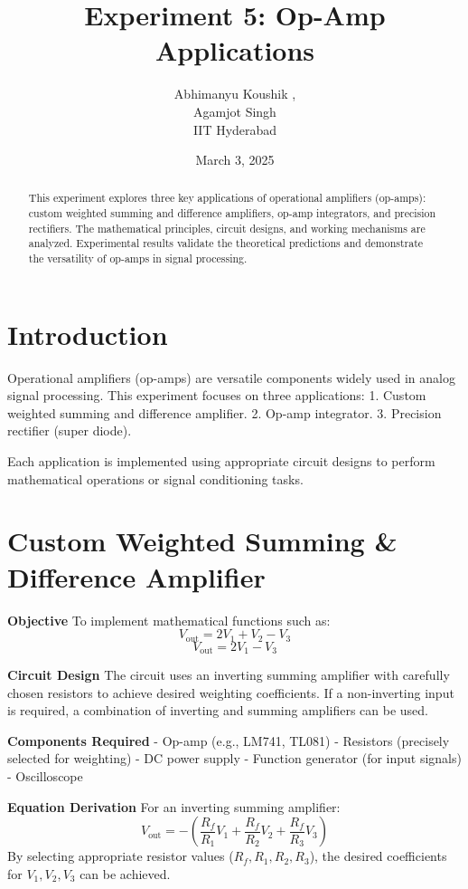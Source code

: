\documentclass[12pt]{article}
\title{\textbf{Experiment 5: Op-Amp Applications}}
\author{Abhimanyu Koushik \brak{\text{EE24BTECH11024}},\\Agamjot Singh \brak{\text{EE24BTECH11002}}\\IIT Hyderabad}
\date{March 3, 2025}
\begin{document}
\maketitle

\begin{abstract}
This experiment explores three key applications of operational amplifiers (op-amps): custom weighted summing and difference amplifiers, op-amp integrators, and precision rectifiers. The mathematical principles, circuit designs, and working mechanisms are analyzed. Experimental results validate the theoretical predictions and demonstrate the versatility of op-amps in signal processing.
\end{abstract}

\section{  Introduction}
Operational amplifiers (op-amps) are versatile components widely used in analog signal processing. This experiment focuses on three applications:
1. Custom weighted summing and difference amplifier.
2. Op-amp integrator.
3. Precision rectifier (super diode).

Each application is implemented using appropriate circuit designs to perform mathematical operations or signal conditioning tasks.

\section{ Custom Weighted Summing \& Difference Amplifier}

\textbf{Objective}
To implement mathematical functions such as:
\[
V_{\text{out}} = 2V_1 + V_2 - V_3
\]
\[
V_{\text{out}} = 2V_1 - V_3
\]

 \textbf{Circuit Design}
The circuit uses an inverting summing amplifier with carefully chosen resistors to achieve desired weighting coefficients. If a non-inverting input is required, a combination of inverting and summing amplifiers can be used.

 \textbf{Components Required}
- Op-amp (e.g., LM741, TL081)
- Resistors (precisely selected for weighting)
- DC power supply
- Function generator (for input signals)
- Oscilloscope

 \textbf{Equation Derivation}
For an inverting summing amplifier:
\[
V_{\text{out}} = -\left(\frac{R_f}{R_1} V_1 + \frac{R_f}{R_2} V_2 + \frac{R_f}{R_3} V_3 \right)
\]
By selecting appropriate resistor values (\(R_f, R_1, R_2, R_3\)), the desired coefficients for \(V_1, V_2, V_3\) can be achieved.
\end{document}
